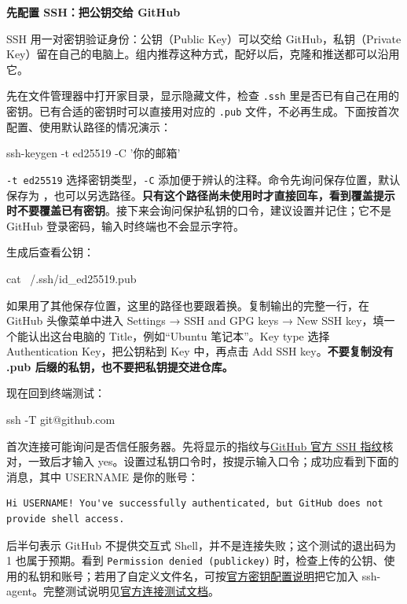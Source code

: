 \par\medskip\noindent\textbf{先配置 SSH：把公钥交给 GitHub}\par
SSH 用一对密钥验证身份：公钥（Public Key）可以交给 GitHub，私钥（Private Key）留在自己的电脑上。组内推荐这种方式，配好以后，克隆和推送都可以沿用它。
\begin{example}[添加密钥并验证连接]
先在文件管理器中打开家目录，显示隐藏文件，检查 \texttt{.ssh} 里是否已有自己在用的密钥。已有合适的密钥时可以直接用对应的 \texttt{.pub} 文件，不必再生成。下面按首次配置、使用默认路径的情况演示：
\begin{tbash}
ssh-keygen -t ed25519 -C '你的邮箱'
\end{tbash}
\texttt{-t ed25519} 选择密钥类型，\texttt{-C} 添加便于辨认的注释。命令先询问保存位置，默认保存为 ，也可以另选路径。\textbf{只有这个路径尚未使用时才直接回车，看到覆盖提示时不要覆盖已有密钥}。接下来会询问保护私钥的口令，建议设置并记住；它不是 GitHub 登录密码，输入时终端也不会显示字符。

生成后查看公钥：
\begin{tbash}
cat ~/.ssh/id_ed25519.pub
\end{tbash}
如果用了其他保存位置，这里的路径也要跟着换。复制输出的完整一行，在 GitHub 头像菜单中进入 Settings → SSH and GPG keys → New SSH key，填一个能认出这台电脑的 Title，例如“Ubuntu 笔记本”。Key type 选择 Authentication Key，把公钥粘到 Key 中，再点击 Add SSH key。\textbf{不要复制没有 .pub 后缀的私钥，也不要把私钥提交进仓库。}

现在回到终端测试：
\begin{tbash}
ssh -T git@github.com
\end{tbash}
首次连接可能询问是否信任服务器。先将显示的指纹与\href{https://docs.github.com/en/authentication/keeping-your-account-and-data-secure/githubs-ssh-key-fingerprints}{GitHub 官方 SSH 指纹}核对，一致后才输入 yes。设置过私钥口令时，按提示输入口令；成功应看到下面的消息，其中 USERNAME 是你的账号：
\begin{lstlisting}[language={},frame=single]
Hi USERNAME! You've successfully authenticated, but GitHub does not provide shell access.
\end{lstlisting}
后半句表示 GitHub 不提供交互式 Shell，并不是连接失败；这个测试的退出码为 1 也属于预期。看到 \texttt{Permission denied (publickey)} 时，检查上传的公钥、使用的私钥和账号；若用了自定义文件名，可按\href{https://docs.github.com/en/authentication/connecting-to-github-with-ssh/generating-a-new-ssh-key-and-adding-it-to-the-ssh-agent?platform=linux}{官方密钥配置说明}把它加入 ssh-agent。完整测试说明见\href{https://docs.github.com/en/authentication/connecting-to-github-with-ssh/testing-your-ssh-connection}{官方连接测试文档}。
\end{example}

